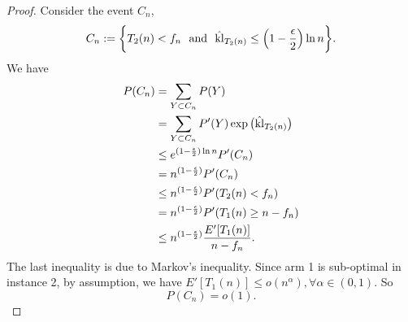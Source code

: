 \begin{proof}
    Consider the event $C_n$,
    \begin{align}
        C_n:=\bigg\{ T_2(n)<f_n
            ~~\text{and}~~
            \hat {{\mathop{\mathrm{kl}}}}_{T_2(n)} \le \Big(1-\frac{\epsilon}{2}\Big)\ln n \bigg\}.
    \end{align}
    We have
    \begin{align}
        P(C_n)
            &= \sum_{Y\subset C_n} P(Y) \\
            &= \sum_{Y\subset C_n} P'(Y) \exp\big(\hat{{\mathop{\mathrm{kl}}}}_{T_2(n)}\big) \\
            &\le e^{(1-\frac{\epsilon}{2})\ln n} P'(C_n) \\
            &= n^{(1-\frac{\epsilon}{2})} P'(C_n) \\
            &\le n^{(1-\frac{\epsilon}{2})} P'(T_2(n)<f_n) \\
            &= n^{(1-\frac{\epsilon}{2})} P'(T_1(n)\ge n-f_n) \\
            &\le n^{(1-\frac{\epsilon}{2})} \frac{E'[T_1(n)]}{n-f_n}.
    \end{align}
    The last inequality is due to Markov's inequality.
    Since arm 1 is sub-optimal in instance 2,
    by assumption, we have $E'[T_1(n)]\le o(n^\alpha), \forall \alpha\in(0,1)$.
    So
    \begin{equation}
        P(C_n)=o(1). \label{eq:2_52}
    \end{equation}


\end{proof}
